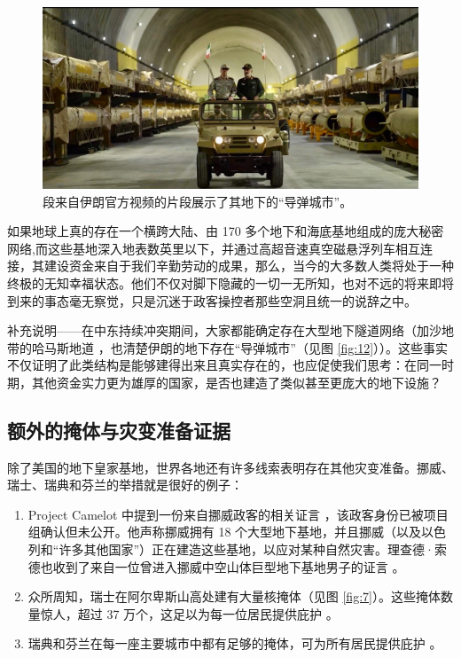 \documentclass[10pt,twocolumn,letterpaper]{article}
\begin{document}
\begin{figure}[t]
\begin{center}
   \includegraphics[width=1\linewidth]{iran.jpeg}
\end{center}
   \caption{段来自伊朗官方视频的片段展示了其地下的“导弹城市”\cite{39,40}。}
\label{fig:12}
\label{fig:onecol}
\end{figure}

如果地球上真的存在一个横跨大陆、由 170 多个地下和海底基地组成的庞大秘密网络,而这些基地深入地表数英里以下，并通过高超音速真空磁悬浮列车相互连接，其建设资金来自于我们辛勤劳动的成果，那么，当今的大多数人类将处于一种终极的无知幸福状态。他们不仅对脚下隐藏的一切一无所知，也对不远的将来即将到来的事态毫无察觉，只是沉迷于政客操控者那些空洞且统一的说辞之中。

补充说明——在中东持续冲突期间，大家都能确定存在大型地下隧道网络（加沙地带的哈马斯地道 \cite{38}，也清楚伊朗的地下存在“导弹城市”（见图 \ref{fig:12}）\cite{39,40}）。这些事实不仅证明了此类结构是能够建得出来且真实存在的，也应促使我们思考：在同一时期，其他资金实力更为雄厚的国家，是否也建造了类似甚至更庞大的地下设施？

\subsection{额外的掩体与灾变准备证据}

除了美国的地下皇家基地，世界各地还有许多线索表明存在其他灾变准备。挪威、瑞士、瑞典和芬兰的举措就是很好的例子：

\begin{flushleft}
\begin{enumerate}
    \item Project Camelot 中提到一份来自挪威政客的相关证言 \cite{25,26}，该政客身份已被项目组确认但未公开。他声称挪威拥有 18 个大型地下基地，并且挪威（以及以色列和“许多其他国家”）正在建造这些基地，以应对某种自然灾害。理查德·索德也收到了来自一位曾进入挪威中空山体巨型地下基地男子的证言 \cite{22}。
    \item 众所周知，瑞士在阿尔卑斯山高处建有大量核掩体（见图 \ref{fig:7}）。这些掩体数量惊人，超过 37 万个，这足以为每一位居民提供庇护 \cite{27}。
    \item 瑞典和芬兰在每一座主要城市中都有足够的掩体，可为所有居民提供庇护 \cite{27}。
\end{enumerate}
\end{flushleft}
\end{document}
